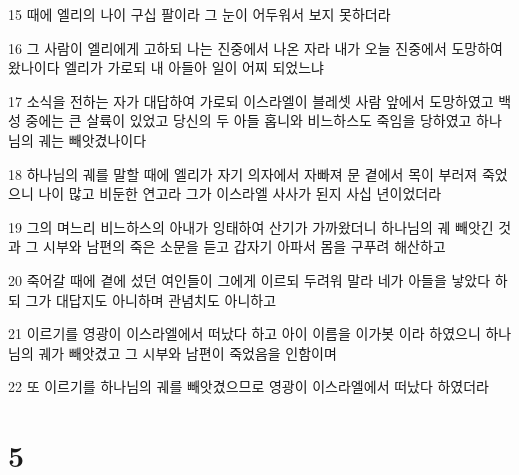 \par 15 때에 엘리의 나이 구십 팔이라 그 눈이 어두워서 보지 못하더라
\par 16 그 사람이 엘리에게 고하되 나는 진중에서 나온 자라 내가 오늘 진중에서 도망하여 왔나이다 엘리가 가로되 내 아들아 일이 어찌 되었느냐
\par 17 소식을 전하는 자가 대답하여 가로되 이스라엘이 블레셋 사람 앞에서 도망하였고 백성 중에는 큰 살륙이 있었고 당신의 두 아들 홉니와 비느하스도 죽임을 당하였고 하나님의 궤는 빼앗겼나이다
\par 18 하나님의 궤를 말할 때에 엘리가 자기 의자에서 자빠져 문 곁에서 목이 부러져 죽었으니 나이 많고 비둔한 연고라 그가 이스라엘 사사가 된지 사십 년이었더라
\par 19 그의 며느리 비느하스의 아내가 잉태하여 산기가 가까왔더니 하나님의 궤 빼앗긴 것과 그 시부와 남편의 죽은 소문을 듣고 갑자기 아파서 몸을 구푸려 해산하고
\par 20 죽어갈 때에 곁에 섰던 여인들이 그에게 이르되 두려워 말라 네가 아들을 낳았다 하되 그가 대답지도 아니하며 관념치도 아니하고
\par 21 이르기를 영광이 이스라엘에서 떠났다 하고 아이 이름을 이가봇 이라 하였으니 하나님의 궤가 빼앗겼고 그 시부와 남편이 죽었음을 인함이며
\par 22 또 이르기를 하나님의 궤를 빼앗겼으므로 영광이 이스라엘에서 떠났다 하였더라

\chapter{5}

